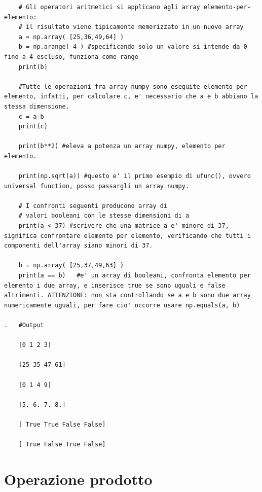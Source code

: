 \begin{lstlisting}
	# Gli operatori aritmetici si applicano agli array elemento-per-elemento:
	# il risultato viene tipicamente memorizzato in un nuovo array
	a = np.array( [25,36,49,64] )
	b = np.arange( 4 ) #specificando solo un valore si intende da 0 fino a 4 escluso, funziona come range 
	print(b)

	#Tutte le operazioni fra array numpy sono eseguite elemento per elemento, infatti, per calcolare c, e' necessario che a e b abbiano la stessa dimensione.
	c = a-b
	print(c)

	print(b**2) #eleva a potenza un array numpy, elemento per elemento.

	print(np.sqrt(a)) #questo e' il primo esempio di ufunc(), ovvero universal function, posso passargli un array numpy.

	# I confronti seguenti producono array di
	# valori booleani con le stesse dimensioni di a
	print(a < 37) #scrivere che una matrice a e' minore di 37, significa confrontare elemento per elemento, verificando che tutti i componenti dell'array siano minori di 37.

	b = np.array( [25,37,49,63] )
	print(a == b)	#e' un array di booleani, confronta elemento per elemento i due array, e inserisce true se sono uguali e false altrimenti. ATTENZIONE: non sta controllando se a e b sono due array numericamente uguali, per fare cio' occorre usare np.equals(a, b)
	
.	#Output

	[0 1 2 3]

	[25 35 47 61]

	[0 1 4 9]

	[5. 6. 7. 8.]
	
	[ True True False False]
	
	[ True False True False]
\end{lstlisting}

\newpage

\section{Operazione prodotto}

